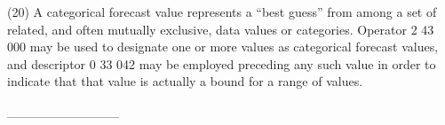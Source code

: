(20) A categorical forecast value represents a ``best guess'' from among a set of related, and often mutually exclusive, data values or categories. Operator 2 43 000 may be used to designate one or more values as categorical forecast values, and descriptor 0 33 042 may be employed preceding any such value in order to indicate that that value is actually a bound for a range of values.

\_\_\_\_\_\_\_\_\_\_\_\_
